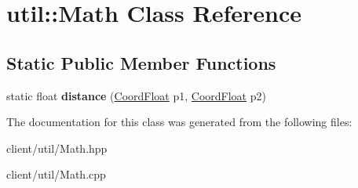 \hypertarget{classutil_1_1_math}{\section{util\-:\-:Math Class Reference}
\label{classutil_1_1_math}
}
\subsection*{Static Public Member Functions}
\begin{DoxyCompactItemize}
\item 
\hypertarget{classutil_1_1_math_a957aff2dd0420b4a8869b4ad33c0440b}{static float {\bfseries distance} (\hyperlink{classutil_1_1_coordinates}{Coord\-Float} p1, \hyperlink{classutil_1_1_coordinates}{Coord\-Float} p2)}\label{classutil_1_1_math_a957aff2dd0420b4a8869b4ad33c0440b}

\end{DoxyCompactItemize}


The documentation for this class was generated from the following files\-:\begin{DoxyCompactItemize}
\item 
client/util/Math.\-hpp\item 
client/util/Math.\-cpp\end{DoxyCompactItemize}
